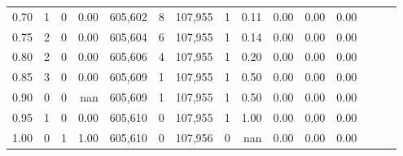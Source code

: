 \begin{tabular}{rrrrrrrrrrrrrrr}
0.70 &        1 &       0 &  0.00 &  605,602 &        8 &  107,955 &        1 &  0.11 &  0.00 &  0.00 &      0.00 \\
0.75 &        2 &       0 &  0.00 &  605,604 &        6 &  107,955 &        1 &  0.14 &  0.00 &  0.00 &      0.00 \\
0.80 &        2 &       0 &  0.00 &  605,606 &        4 &  107,955 &        1 &  0.20 &  0.00 &  0.00 &      0.00 \\
0.85 &        3 &       0 &  0.00 &  605,609 &        1 &  107,955 &        1 &  0.50 &  0.00 &  0.00 &      0.00 \\
0.90 &        0 &       0 &   nan &  605,609 &        1 &  107,955 &        1 &  0.50 &  0.00 &  0.00 &      0.00 \\
0.95 &        1 &       0 &  0.00 &  605,610 &        0 &  107,955 &        1 &  1.00 &  0.00 &  0.00 &      0.00 \\
1.00 &        0 &       1 &  1.00 &  605,610 &        0 &  107,956 &        0 &   nan &  0.00 &  0.00 &      0.00 \\
\bottomrule
\end{tabular}
